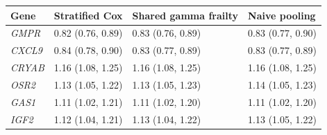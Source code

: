 \begin{tabular}{@{}llll@{}}
\toprule
Gene & Stratified Cox & Shared gamma frailty & Naive pooling \\
\midrule
\textit{GMPR} & 0.82 (0.76, 0.89) & 0.83 (0.76, 0.89) & 0.83 (0.77, 0.90) \\
\textit{CXCL9} & 0.84 (0.78, 0.90) & 0.83 (0.77, 0.89) & 0.83 (0.77, 0.89) \\
\textit{CRYAB} & 1.16 (1.08, 1.25) & 1.16 (1.08, 1.25) & 1.16 (1.08, 1.25) \\
\textit{OSR2} & 1.13 (1.05, 1.22) & 1.13 (1.05, 1.23) & 1.14 (1.05, 1.23) \\
\textit{GAS1} & 1.11 (1.02, 1.21) & 1.11 (1.02, 1.20) & 1.11 (1.02, 1.20) \\
\textit{IGF2} & 1.12 (1.04, 1.21) & 1.13 (1.04, 1.22) & 1.13 (1.05, 1.22) \\
\bottomrule
\end{tabular}
